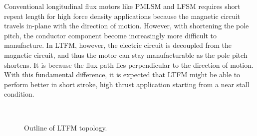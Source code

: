         
        Conventional longitudinal flux motors like \acs{PMLSM} and \acs{LFSM} requires short repeat length for high force density applications because the magnetic circuit travels in-plane with the direction of motion. However, with shortening the pole pitch, the conductor component become increasingly more difficult to manufacture. In \acf{LTFM}, however, the electric circuit is decoupled from the magnetic circuit, and thus the motor can stay manufacturable as the pole pitch shortens. It is because the flux path lies perpendicular to the direction of motion. With this fundamental difference, it is expected that \acs{LTFM} might be able to perform better in short stroke, high thrust application starting from a near stall condition. 
        
        
        \begin{figure}[!ht]
            \centering
            \\
            \caption{Outline of \acs{LTFM} topology.}
            \label{fig:chapter/rsm/LTFM/different LTFM arrangement}
        \end{figure}

